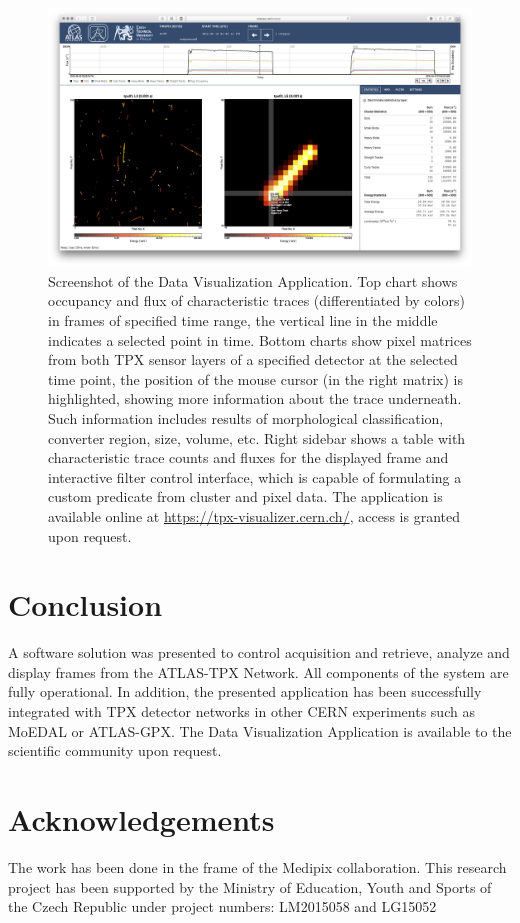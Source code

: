 \documentclass[conference]{IEEEtran}
\begin{document}
\begin{figure}[tbp]
	\centering
        \includegraphics[clip, width=\textwidth, angle = 0 ]{Plots/screen-tpx01-crosshair-zoomed.png}
	  \caption {Screenshot of the Data Visualization Application. \cite{Manek2016} Top chart shows occupancy and flux of characteristic traces (differentiated by colors) in frames of specified time range, the vertical line in the middle indicates a selected point in time. Bottom charts show pixel matrices from both TPX sensor layers of a specified detector at the selected time point, the position of the mouse cursor (in the right matrix) is highlighted, showing more information about the trace underneath. Such information includes results of morphological classification, converter region, size, volume, etc. Right sidebar shows a table with characteristic trace counts and fluxes for the displayed frame and interactive filter control interface, which is capable of formulating a custom predicate from cluster and pixel data. The application is available online at \url{https://tpx-visualizer.cern.ch/}, access is granted upon request.}
    \label{fig:visualizer}
\end{figure}

\section{\label{sec:conclusion}Conclusion}
A software solution was presented to control acquisition and retrieve, analyze and display frames from the ATLAS-TPX Network. All components of the system are fully operational. In addition, the presented application has been successfully integrated with TPX detector networks in other CERN experiments such as MoEDAL or ATLAS-GPX. The Data Visualization Application is available to the scientific community upon request.

\section*{\label{sec:acknowledgements}Acknowledgements}
The work has been done in the frame of the Medipix collaboration. This research project has been supported by the Ministry of Education, Youth and Sports of the Czech Republic under project numbers: LM2015058 and LG15052

%

%
\end{document}
